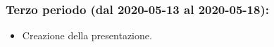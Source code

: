		\subsubsection{Terzo periodo (dal 2020-05-13 al 2020-05-18):}
			\begin{itemize}
				\item Creazione della presentazione.
			\end{itemize}

